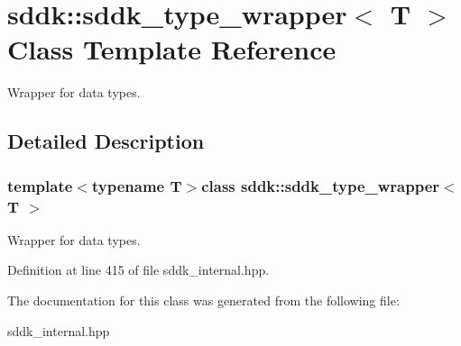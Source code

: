 \hypertarget{classsddk_1_1sddk__type__wrapper}{}\section{sddk\+:\+:sddk\+\_\+type\+\_\+wrapper$<$ T $>$ Class Template Reference}
\label{classsddk_1_1sddk__type__wrapper}


Wrapper for data types.  




\subsection{Detailed Description}
\subsubsection*{template$<$typename T$>$class sddk\+::sddk\+\_\+type\+\_\+wrapper$<$ T $>$}

Wrapper for data types. 

Definition at line 415 of file sddk\+\_\+internal.\+hpp.



The documentation for this class was generated from the following file\+:\begin{DoxyCompactItemize}
\item 
sddk\+\_\+internal.\+hpp\end{DoxyCompactItemize}
